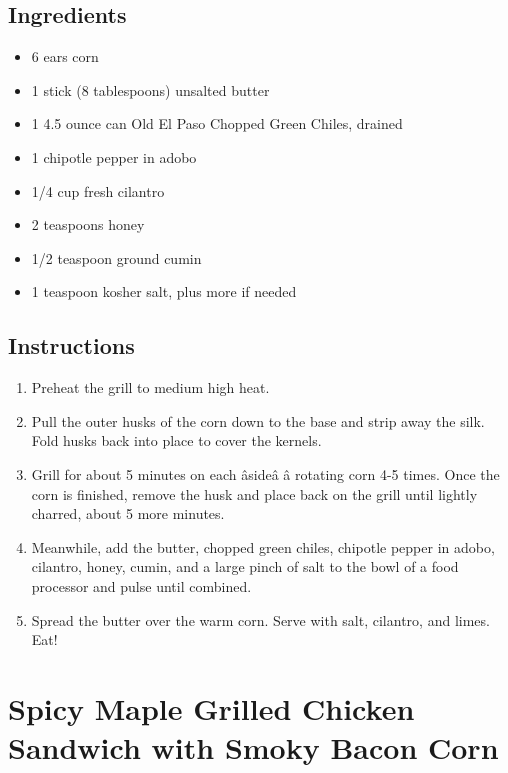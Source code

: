 \documentclass[
  letterpaper,
  DIV=11,
  numbers=noendperiod,
  titlepage=false]{scrreprt}
\providecommand{\tightlist}{%
  \setlength{\itemsep}{0pt}\setlength{\parskip}{0pt}}\usepackage{longtable,booktabs,array}
\begin{document}
\section{Ingredients}\label{ingredients-91}

\begin{itemize}
\tightlist
\item
  6 ears corn
\item
  1 stick (8 tablespoons) unsalted butter
\item
  1 4.5 ounce can Old El Paso Chopped Green Chiles, drained
\item
  1 chipotle pepper in adobo
\item
  1/4 cup fresh cilantro
\item
  2 teaspoons honey
\item
  1/2 teaspoon ground cumin
\item
  1 teaspoon kosher salt, plus more if needed
\end{itemize}

\section{Instructions}\label{instructions-91}

\begin{enumerate}
\def\labelenumi{\arabic{enumi}.}
\tightlist
\item
  Preheat the grill to medium high heat.
\item
  Pull the outer husks of the corn down to the base and strip away the
  silk. Fold husks back into place to cover the kernels.
\item
  Grill for about 5 minutes on each âsideâ â rotating corn 4-5 times.
  Once the corn is finished, remove the husk and place back on the grill
  until lightly charred, about 5 more minutes.
\item
  Meanwhile, add the butter, chopped green chiles, chipotle pepper in
  adobo, cilantro, honey, cumin, and a large pinch of salt to the bowl
  of a food processor and pulse until combined.
\item
  Spread the butter over the warm corn. Serve with salt, cilantro, and
  limes. Eat!
\end{enumerate}


\chapter{Spicy Maple Grilled Chicken Sandwich with Smoky Bacon
Corn}\label{spicy-maple-grilled-chicken-sandwich-with-smoky-bacon-corn}
\end{document}
